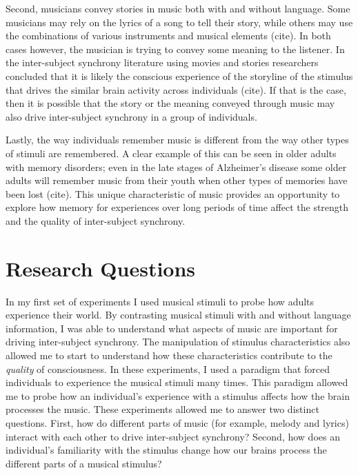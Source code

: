 Second, musicians convey stories in music both with and without language. Some musicians may rely on the lyrics of a song to tell their story, while others may use the combinations of various instruments and musical elements (cite). 
In both cases however, the musician is trying to convey some meaning to the listener. 
In the inter-subject synchrony literature using movies and stories researchers concluded that it is likely the conscious experience of the storyline of the stimulus that drives the similar brain activity across individuals (cite). 
If that is the case, then it is possible that the story or the meaning conveyed through music may also drive inter-subject synchrony in a group of individuals. 

Lastly, the way individuals remember music is different from the way other types of stimuli are remembered. 
A clear example of this can be seen in older adults with memory disorders; even in the late stages of Alzheimer's disease some older adults will remember music from their youth when other types of memories have been lost (cite). 
This unique characteristic of music provides an opportunity to explore how memory for experiences over long periods of time affect the strength and the quality of inter-subject synchrony. 

\section{Research Questions}
In my first set of experiments I used musical stimuli to probe how adults experience their world. 
By contrasting musical stimuli with and without language information, I was able to understand what aspects of music are important for driving inter-subject synchrony. 
The manipulation of stimulus characteristics also allowed me to start to understand how these characteristics contribute to the \textit{quality} of consciousness.
In these experiments, I used a paradigm that forced individuals to experience the musical stimuli many times.
This paradigm allowed me to probe how an individual's experience with a stimulus affects how the brain processes the music.
These experiments allowed me to answer two distinct questions. First, how do different parts of music (for example, melody and lyrics) interact with each other to drive inter-subject synchrony? Second, how does an individual's familiarity with the stimulus change how our brains process the different parts of a musical stimulus?

